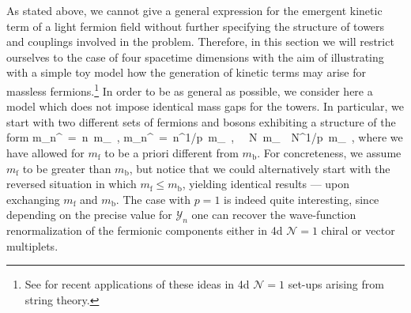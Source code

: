 As stated above, we cannot give a general expression for the emergent kinetic term of a light fermion field without further specifying the structure of towers and couplings involved in the problem. Therefore, in this section we will restrict ourselves to the case of four spacetime dimensions with the aim of illustrating with a simple toy model how the generation of kinetic terms may arise for massless fermions.\footnote{See \cite{Casas:2024ttx} for recent applications of these ideas in 4d $\mathcal{N}=1$ set-ups arising from string theory.} In order to be as general as possible, we consider here a model which does not impose identical mass gaps for the towers. In particular, we start with two different sets of fermions and bosons exhibiting a structure of the form
%
\beq
	m_n^{}\, =\, n\, m_{}\, , \qquad m_n^{}\, =\, n^{1/p}\, m_{}\, , \qquad  \LSP\, \simeq\, N\, m_{}\, \simeq\, N^{1/p}\, m_{}\, ,
\label{eq:dostorres}
\eeq
%
where we have allowed for $m_{\mathrm{f}}$ to be a priori different from $m_{\mathrm{b}}$. For concreteness, we assume $m_{\mathrm{f}}$ to be greater than $m_{\mathrm{b}}$, but notice that we could alternatively start with the reversed situation in which $m_{\mathrm{f}} \leq m_{\mathrm{b}}$, yielding identical results --- upon exchanging $m_{\mathrm{f}}$ and $m_{\mathrm{b}}$. The case with $p=1$ is indeed quite interesting, since depending on the precise value for $\mathcal{Y}_n$ one can recover the wave-function renormalization of the fermionic components either in 4d $\mathcal{N}=1$ chiral or vector multiplets. 
	

